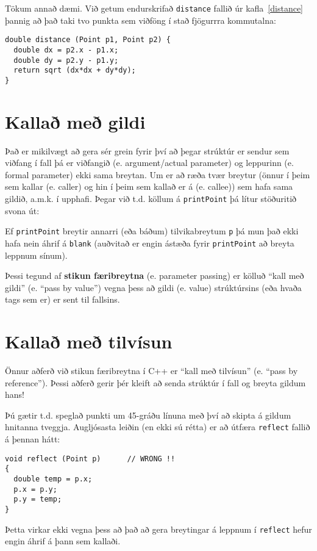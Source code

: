 Tökum annað dæmi.  Við getum endurskrifað {\tt distance} fallið úr kafla~\ref{distance} þannig að það taki tvo punkta sem viðföng í stað fjögurrra kommutalna:

\begin{verbatim}
double distance (Point p1, Point p2) {
  double dx = p2.x - p1.x;
  double dy = p2.y - p1.y;
  return sqrt (dx*dx + dy*dy);
}
\end{verbatim}

\section{Kallað með gildi}

Það er mikilvægt að gera sér grein fyrir því að þegar strúktúr er sendur sem viðfang í fall þá er viðfangið (e. argument/actual parameter) og leppurinn (e. formal parameter) ekki sama breytan.
Um er að ræða tvær breytur (önnur í þeim sem kallar (e. caller) og hin í þeim sem kallað er á (e. callee)) sem hafa sama gildið, a.m.k. í upphafi.
Þegar við t.d. köllum á {\tt printPoint} þá lítur stöðuritið svona út: 

\vspace{0.1in}
\centerline{}
\vspace{0.1in}
%
Ef {\tt printPoint} breytir annarri (eða báðum) tilvikabreytum {\tt p} þá mun það ekki hafa nein áhrif á {\tt blank} (auðvitað er engin ástæða fyrir {\tt printPoint} að breyta leppnum sínum).

Þessi tegund af {\bf stikun færibreytna} (e. parameter passing) er kölluð ``kall með gildi'' (e. ``pass by value'')
vegna þess að gildi (e. value) strúktúrsins (eða hvaða tags sem er) er sent til fallsins.

\section{Kallað með tilvísun}

Önnur aðferð við stikun færibreytna í C++ er ``kall með tilvísun'' (e. ``pass by reference'').
Þessi aðferð gerir þér kleift að senda strúktúr í fall og breyta gildum hans!

Þú gætir t.d. speglað punkti um 45-gráðu línuna með því að skipta á gildum hnitanna tveggja.
Augljósasta leiðin (en ekki sú rétta) er að útfæra {\tt reflect} fallið á þennan hátt:

\begin{verbatim}
void reflect (Point p)      // WRONG !!
{
  double temp = p.x;
  p.x = p.y;
  p.y = temp;
}
\end{verbatim}
%
Þetta virkar ekki vegna þess að það að gera breytingar á leppnum í {\tt reflect} hefur engin áhrif á þann sem kallaði.

